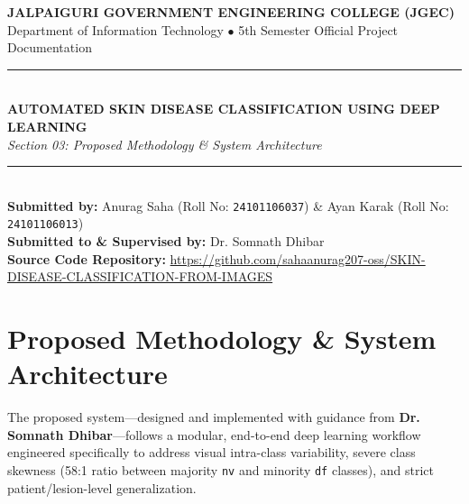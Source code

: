 \documentclass[12pt,a4paper]{article}
\begin{document}
\begin{center}
    {\Large \textbf{\color{primary} JALPAIGURI GOVERNMENT ENGINEERING COLLEGE (JGEC)}}\\[0.3em]
    {\normalsize Department of Information Technology $\bullet$ 5th Semester Official Project Documentation}\\[1em]
    \rule{\linewidth}{1.5pt}\\[0.5em]
    {\LARGE \textbf{AUTOMATED SKIN DISEASE CLASSIFICATION USING DEEP LEARNING}}\\[0.3em]
    {\large \textit{Section 03: Proposed Methodology \& System Architecture}}\\[0.3em]
    \rule{\linewidth}{1.5pt}\\[0.8em]
    \textbf{Submitted by:} Anurag Saha (Roll No: \texttt{24101106037}) \& Ayan Karak (Roll No: \texttt{24101106013})\\[0.3em]
    \textbf{Submitted to \& Supervised by:} Dr. Somnath Dhibar\\[0.3em]
    \textbf{Source Code Repository:} \url{https://github.com/sahaanurag207-oss/SKIN-DISEASE-CLASSIFICATION-FROM-IMAGES}
\end{center}

\vspace{0.8em}

\section{Proposed Methodology \& System Architecture}
The proposed system---designed and implemented with guidance from \textbf{Dr. Somnath Dhibar}---follows a modular, end-to-end deep learning workflow engineered specifically to address visual intra-class variability, severe class skewness (58:1 ratio between majority \texttt{nv} and minority \texttt{df} classes), and strict patient/lesion-level generalization.
\end{document}
